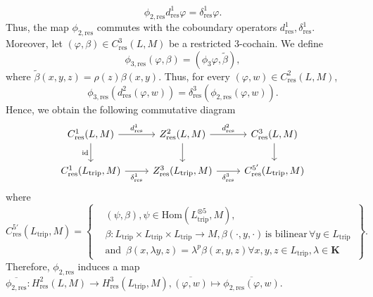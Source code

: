 \documentclass[11pt, twoside]{article}
\begin{document}
\begin{equation}
    \phi_{2,\mathrm{res}}d^1_\mathrm{res}\varphi= \delta^1_\mathrm{res}\varphi.
\end{equation} Thus, the map $\phi_{2,\mathrm{res}} $ commutes with the coboundary operators $d^1_\mathrm{res},\delta^1_\mathrm{res} $. Moreover, let $(\varphi,\beta)\in C^3_\mathrm{res}(L,M) $ be a restricted $3$-cochain. We define $$\phi_{3,\mathrm{res}}(\varphi,\beta)=(\phi_3\varphi,\tilde{\beta}), $$ where $\tilde{\beta}(x,y,z)=\rho(z)\beta(x,y) $. Thus, for every $(\varphi,w)\in C^2_\mathrm{res}(L,M) $, \begin{equation}
    \phi_{3,\mathrm{res}}(d^2_\mathrm{res}(\varphi,w))=\delta^3_\mathrm{res}(\phi_{2,\mathrm{res}}(\varphi,w)).
\end{equation} Hence, we obtain the following commutative diagram \[\begin{tikzcd}
	{C^1_\mathrm{res}(L,M)} & {Z_\mathrm{res}^2(L,M)} & {C_\mathrm{res}^3(L,M)} \\
	{C^1_\mathrm{res}(L_\mathrm{trip},M)} & {Z_\mathrm{res}^3(L_\mathrm{trip},M)} & {C^{5'}_\mathrm{res}(L_\mathrm{trip},M)}
	\arrow["{d_\mathrm{res}^1}", from=1-1, to=1-2]
	\arrow["{\mathrm{id}}"', from=1-1, to=2-1]
	\arrow["{d_\mathrm{res}^2}", from=1-2, to=1-3]
	\arrow[from=1-2, to=2-2]
	\arrow[from=1-3, to=2-3]
	\arrow["{\delta_\mathrm{res}^1}"', from=2-1, to=2-2]
	\arrow["{\delta_\mathrm{res}^3}"', from=2-2, to=2-3]
\end{tikzcd}\] where \[C^{5'}_\mathrm{res}(L_\mathrm{trip},M)= \left\{\begin{aligned}
    &(\psi,\beta), \psi\in \mathrm{Hom}(L_\mathrm{trip}^{\otimes 5},M), \\&\beta: L_\mathrm{trip}\times L_\mathrm{trip}\times L_\mathrm{trip}\to M,\beta(\cdot,y,\cdot)\, \text{is bilinear}\, \forall y\in L_\mathrm{trip}\, \\ &\text{and  } \, \beta(x,\lambda y,z)=\lambda^p\beta(x,y,z) \forall x,y,z\in L_\mathrm{trip},\lambda\in \mathbf{K}
\end{aligned}
    \right\}.\]  Therefore, $\phi_{2,\mathrm{res}} $ induces a map $\overline{\phi_{2,\mathrm{res}}}: H_\mathrm{res}^2(L,M)\to H^3_\mathrm{res}(L_\mathrm{trip},M),\overline{(\varphi,w)}\mapsto\overline{\phi_{2,\mathrm{res}}{(\varphi,w)}} $.
\end{document}
